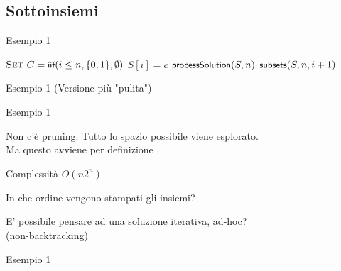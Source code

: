 \subsection{Sottoinsiemi}

\begin{frame}{Esempio 1}


\begin{Procedure}
\caption[A]{\enumerasottoinsiemi($\INTEGER[\,]\ S$, \INTEGER $n$, \INTEGER $i$)}
$\textsc{Set}\ C = \textsf{{\small iif}}(i \leq n, \{ 0, 1 \}, \emptyset)$\;
{
  $S[i] = c$\;
  {
    $\textsf{{\small processSolution}}(S,n)$\;
  }
  $\textsf{{\small subsets}}(S, n, i+1)$\;
}
\end{Procedure}


\end{frame}

\begin{frame}{Esempio 1 (Versione più "pulita")}


\begin{Procedure}
\caption[A]{\enumerasottoinsiemi($\INTEGER[\,]\ S$, \INTEGER $n$, \INTEGER $i$)}
\end{Procedure}

\end{frame}

\begin{frame}{Esempio 1}
	
\BIL
\item Non c'è pruning. Tutto lo spazio possibile viene esplorato.\\
Ma questo avviene per definizione
\item Complessità $O(n 2^n)$
\item In che ordine vengono stampati gli insiemi?
\item E' possibile pensare ad una soluzione iterativa, ad-hoc?\\
(non-backtracking)
\EIL

\end{frame}

\begin{frame}{Esempio 1}

\begin{Procedure}
\caption[A]{\enumerasottoinsiemi(\INTEGER $n$)}
\end{Procedure}


\end{frame}



